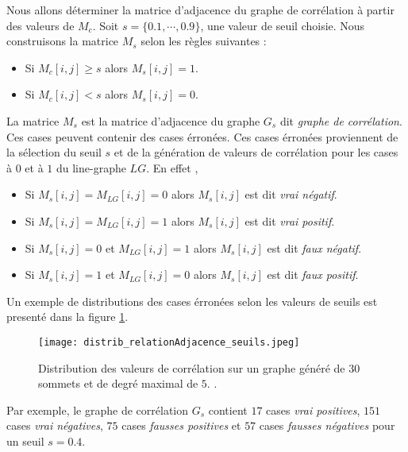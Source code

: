 Nous allons d\'eterminer la matrice d'adjacence du graphe de corr\'elation \`a partir des valeurs de $M_c$.
\newline 
Soit $s = \{ 0.1, \cdots, 0.9\}$, une valeur de seuil choisie.
Nous construisons la matrice $M_s$  selon les r\`egles suivantes : 
\begin{itemize}
\item Si $M_c[i,j] \ge s$ alors $M_s[i,j] = 1$.
\item Si $M_c[i,j] < s$ alors $M_s[i,j] = 0$.
\end{itemize}
La matrice $M_s$ est la matrice d'adjacence du graphe $G_s$  dit {\em graphe de corr\'elation}. Ces cases peuvent contenir des cases \'erron\'ees. Ces cases \'erron\'ees proviennent de la s\'election du seuil $s$ et de la g\'en\'eration de valeurs de corr\'elation pour les cases \`a $0$ et \`a $1$ du line-graphe $LG$. En effet ,
\begin{itemize}
	\item Si $M_s [i,j] = M_{LG} [i,j] = 0$ alors $M_{s} [i,j]$ est dit {\em vrai n\'egatif}. 
	\item Si $M_s [i,j] = M_{LG} [i,j] = 1$ alors $M_{s} [i,j]$ est dit {\em vrai positif}. 
	\item Si $M_s [i,j] = 0$ et $M_{LG} [i,j] = 1$ alors $M_{s} [i,j]$ est dit {\em faux n\'egatif}.
	\item Si $M_s [i,j] = 1$ et $M_{LG} [i,j] = 0$ alors $M_{s} [i,j]$ est dit {\em faux positif}.
\end{itemize}
Un exemple de distributions des cases \'erron\'ees selon les valeurs de seuils est present\'e dans la figure \ref{distrib_relationAdjacence_seuils}. 
\begin{figure}[htb!] 
\centering
\texttt{[image: distrib\_relationAdjacence\_seuils.jpeg]}
\caption{ Distribution des valeurs de corr\'elation sur un graphe g\'en\'er\'e de $30$ sommets et de degr\'e maximal de $5$.
.}
\label{distrib_relationAdjacence_seuils} 
\end{figure}
Par exemple,  le graphe de corr\'elation $G_s$ contient 
$17$ cases {\em vrai positives}, 
$151$ cases {\em vrai n\'egatives}, 
$75$ cases {\em fausses positives} et 
$57$ cases {\em fausses n\'egatives} pour un seuil $s=0.4$.
